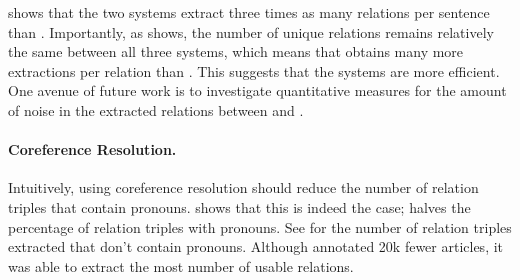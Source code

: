  shows that
the two \openie{} systems extract three times
as many relations per sentence than \reverb{}. Importantly,
as  shows, the number of unique relations 
remains relatively the same between all three systems, which
means that \openie{} obtains many more extractions per
relation than \reverb{}.
This suggests 
that the \openie{} systems are more efficient. One avenue
of future work is to investigate quantitative measures for
the amount of noise in the extracted relations between \openie{}
and \reverb{}.

\paragraph{Coreference Resolution.}
Intuitively, using coreference resolution should reduce the number
of relation triples that contain pronouns.  shows
that this is indeed the case; \openiecoref{} halves the percentage
of relation triples with pronouns. See  for the
number of relation triples extracted that don't contain pronouns.
Although \openiecoref{} annotated 20k fewer articles, it was able
to extract the most number of usable relations.
